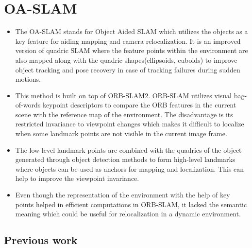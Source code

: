 \documentclass{article}
\begin{document}
\section{OA-SLAM}


\begin{itemize}
\item The OA-SLAM\cite{oaslam} stands for Object Aided SLAM which utilizes the objects as a key feature for aiding mapping and camera relocalization. It is an improved version of quadric SLAM where the feature points within the environment are also mapped along with the quadric shapes(ellipsoids, cuboids) to improve object tracking and pose recovery in case of tracking failures during sudden motions.
\item This method is built on top of ORB-SLAM2. ORB-SLAM utilizes visual bag-of-words keypoint descriptors to compare the ORB features in the current scene with the reference map of the environment. The disadvantage is its restricted invariance to viewpoint changes which makes it difficult to localize when some landmark points are not visible in the current image frame.
\item The low-level landmark points are combined with the quadrics of the object generated through object detection methods to form high-level landmarks where objects can be used as anchors for mapping and localization. This can help to improve the viewpoint invariance.
\item Even though the representation of the environment with the help of key points helped in efficient computations in ORB-SLAM, it lacked the semantic meaning which could be useful for relocalization in a dynamic environment. 
\end{itemize}

\subsection{Previous work}
\end{document}
